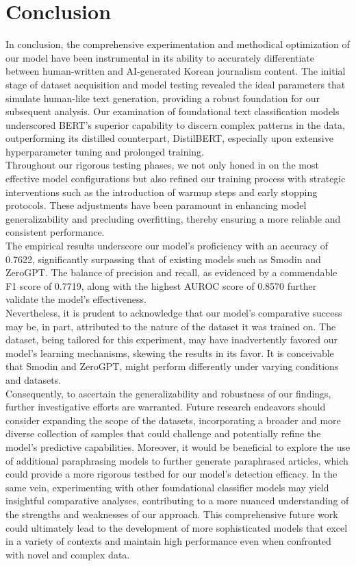 \documentclass{article}
\begin{document}
\section{Conclusion}
\null\quad In conclusion, the comprehensive experimentation and methodical optimization of our model have been instrumental in its ability to accurately differentiate between human-written and AI-generated Korean journalism content.
The initial stage of dataset acquisition and model testing revealed the ideal parameters that simulate human-like text generation, providing a robust foundation for our subsequent analysis.
Our examination of foundational text classification models underscored BERT's superior capability to discern complex patterns in the data, outperforming its distilled counterpart, DistilBERT, especially upon extensive hyperparameter tuning and prolonged training. \\
\null\quad Throughout our rigorous testing phases, we not only honed in on the most effective model configurations but also refined our training process with strategic interventions such as the introduction of warmup steps and early stopping protocols.
These adjustments have been paramount in enhancing model generalizability and precluding overfitting, thereby ensuring a more reliable and consistent performance. \\
\null\quad The empirical results underscore our model's proficiency with an accuracy of 0.7622, significantly surpassing that of existing models such as Smodin and ZeroGPT.
The balance of precision and recall, as evidenced by a commendable F1 score of 0.7719, along with the highest AUROC score of 0.8570 further validate the model's effectiveness. \\
\null\quad Nevertheless, it is prudent to acknowledge that our model's comparative success may be, in part, attributed to the nature of the dataset it was trained on.
The dataset, being tailored for this experiment, may have inadvertently favored our model's learning mechanisms, skewing the results in its favor.
It is conceivable that Smodin and ZeroGPT, might perform differently under varying conditions and datasets. \\
\null\quad Consequently, to ascertain the generalizability and robustness of our findings, further investigative efforts are warranted. 
Future research endeavors should consider expanding the scope of the datasets, incorporating a broader and more diverse collection of samples that could challenge and potentially refine the model's predictive capabilities.
Moreover, it would be beneficial to explore the use of additional paraphrasing models to further generate paraphrased articles, which could provide a more rigorous testbed for our model's detection efficacy.
In the same vein, experimenting with other foundational classifier models may yield insightful comparative analyses, contributing to a more nuanced understanding of the strengths and weaknesses of our approach.
This comprehensive future work could ultimately lead to the development of more sophisticated models that excel in a variety of contexts and maintain high performance even when confronted with novel and complex data. \\
\end{document}
